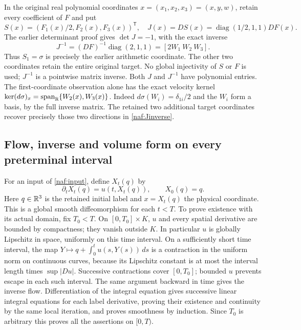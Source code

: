 In the original real polynomial coordinates $x=(x_1,x_2,x_3)=(x,y,w)$,
retain every coefficient of $F$ and put
\begin{equation}
 S(x)=(F_1(x)/2,F_2(x),F_3(x))^{\mathsf T},\quad
 J(x)=DS(x)=\operatorname{diag}(1/2,1,1)DF(x).
 \label{naf:S}
\end{equation}
The earlier determinant proof gives $\det J=-1$, with the exact inverse
\begin{equation}
 J^{-1}=(DF)^{-1}\operatorname{diag}(2,1,1)
       =[2W_1\ W_2\ W_3].
 \label{naf:Jinverse}
\end{equation}
Thus $S_1=\sigma$ is precisely the earlier arithmetic coordinate. The
other two coordinates retain the entire original target. No global
injectivity of $S$ or $F$ is used; $J^{-1}$ is a pointwise matrix inverse.
Both $J$ and $J^{-1}$ have polynomial entries.
The first-coordinate observation alone has the exact velocity kernel
$\ker(d\sigma)_x=\operatorname{span}_{\mathbb R}\{W_2(x),W_3(x)\}$.
Indeed $d\sigma(W_i)=\delta_{1i}/2$ and the $W_i$ form a basis, by
the full inverse matrix. The retained two additional target coordinates
recover precisely those two directions in \eqref{naf:Jinverse}.

\subsection{Flow, inverse and volume form on every preterminal interval}

For an input of \eqref{naf:input}, define $X_t(q)$ by
\[
 \partial_tX_t(q)=u(t,X_t(q)),\qquad X_0(q)=q.
\]
Here $q\in\mathbb R^3$ is the retained initial label and $x=X_t(q)$ the physical
coordinate. This is a global smooth diffeomorphism for each $t<T$.
To prove existence with its actual domain, fix $T_0<T$. On
$[0,T_0]\times K$, $u$ and every spatial derivative are bounded by
compactness; they vanish outside $K$. In particular $u$ is globally
Lipschitz in space, uniformly on this time interval. On a sufficiently
short time interval, the map
$Y\mapsto q+\int_0^t u(s,Y(s))\,ds$ is a contraction in the uniform
norm on continuous curves, because its Lipschitz constant is at most
the interval length times $\sup|Du|$. Successive contractions cover
$[0,T_0]$; bounded $u$ prevents escape in each such interval. The same
argument backward in time gives the inverse flow. Differentiation of
the integral equation gives successive linear integral equations for
each label derivative, proving their existence and continuity by the
same local iteration, and proves smoothness by induction. Since $T_0$
is arbitrary this proves all the assertions on $[0,T)$.

